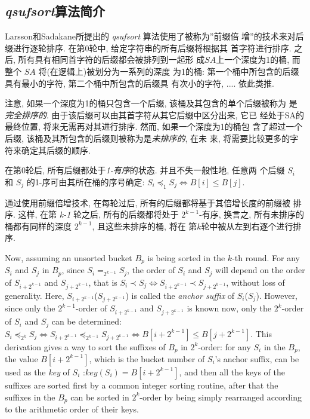 \documentclass{ws-ijprai}
\begin{document}
\subsection{ \emph{qsufsort}算法简介}
\label{sec:qsufsort}

Larsson和Sadakane所提出的 \emph{qsufsort} 算法使用了被称为''前缀倍
增''的技术来对后缀进行逐轮排序. 在第0轮中, 给定字符串的所有后缀将根据其
首字符进行排序. 之后, 所有具有相同首字符的后缀都会被排列到一起形
成$SA$上一个深度为1的桶, 而整个 $SA$ 将(在逻辑上)被划分为一系列的深度
为1的桶: 第一个桶中所包含的后缀具有最小的字符, 第二个桶中所包含的后缀具
有次小的字符, .... 依此类推.

注意, 如果一个深度为1的桶只包含一个后缀, 该桶及其包含的单个后缀被称为
是\emph{完全排序的}. 由于该后缀可以由其首字符从其它后缀中区分出来, 它已
经处于SA的最终位置, 将来无需再对其进行排序. 然而, 如果一个深度为1的桶包
含了超过一个后缀, 该桶及其所包含的后缀则被称为是\emph{未排序的}, 在未
来, 将需要比较更多的字符来确定其后缀的顺序.

在第0轮后, 所有后缀都处于\emph{1-有序}的状态. 并且不失一般性地, 任意两
个后缀 $S_i$ 和 $S_j$ 的1-序可由其所在桶的序号确定:
$S_i \preceq_1 S_j \iff B[i] \leq B[j]$.

通过使用前缀倍增技术, 在每轮过后, 所有的后缀都将基于其倍增长度的前缀被
排序. 这样, 在第 \emph{k-1} 轮之后, 所有的后缀都将处于 $2^{k-1}$-有序,
换言之, 所有未排序的桶都有同样的深度 $2^{k-1}$, 且这些未排序的桶, 将在
第$k$轮中被从左到右逐个进行排序.

Now, assuming an unsorted bucket $B_p$ is being sorted in the $k$-th
round. For any $S_i$ and $S_j$ in $B_p$, since $S_i =_{2^{k-1}} S_j$,
the order of $S_i$ and $S_j$ will depend on the order of
$S_{i+2^{k-1}}$ and $S_{j+2^{k-1}}$, that is $S_i \prec S_j \iff
S_{i+2^{k-1}} \prec S_{j+2^{k-1}}$, without loss of generality. Here,
$S_{i+2^{k-1}}$($S_{j+2^{k-1}}$) is called the \emph{anchor suffix} of
$S_i$($S_j$). However, since only the $2^{k-1}$-order of
$S_{i+2^{k-1}}$ and $S_{j+2^{k-1}}$ is known now, only the $2^k$-order
of $S_i$ and $S_j$ can be determined: $S_i \preceq_{2^k} S_j \iff
S_{i+2^{k-1}} \preceq_{2^{k-1}} S_{j+2^{k-1}} \iff B[i+2^{k-1}] \leq
B[j+2^{k-1}]$.  This derivation gives a way to sort the suffixes of
$B_p$ in $2^k$-order: for any $S_i$ in the $B_p$, the value
$B[i+2^{k-1}]$, which is the bucket number of $S_i$'s anchor suffix,
can be used as the \emph{key} of $S_i$ :$key(S_i) = B[i+2^{k-1}]$, and
then all the keys of the suffixes are sorted first by a common integer
sorting routine, after that the suffixes in the $B_p$ can be sorted in
$2^k$-order by being simply rearranged according to the arithmetic
order of their keys.
\end{document}

